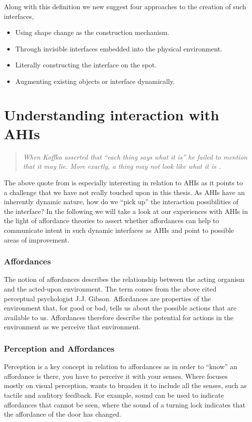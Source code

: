 Along with this definition we new suggest four approaches to the creation of such interfaces,

\begin{itemize}
	\item{Using shape change as the construction mechanism.}
	\item{Through invisible interfaces embedded into the physical environment.}
	\item{Literally constructing the interface on the spot.}
	\item{Augmenting existing objects or interface dynamically.}
\end{itemize} 

\section{Understanding interaction with AHIs}
\begin{quotation}
\emph{When Koffka asserted that ``each thing says what it is'' he failed to mention that it may lie. More exactly, a thing may not look like what it is \citep{gibson1979ecological}.}
\end{quotation}
The above quote from \citeauthor{gibson1979ecological} is especially interesting in relation to AHIs as it points to a challenge that we have not really touched upon in this thesis.
As AHIs have an inherently dynamic nature, how do we ``pick up'' the interaction possibilities of the interface? 
In the following we will take a look at our experiences with AHIs in the light of affordance theories to assert whether affordances can help to communicate intent in such dynamic interfaces as AHIs and point to possible areas of improvement.

\subsubsection{Affordances}
The notion of affordances describes the relationship between the acting organism and the acted-upon environment.
The term comes from the above cited perceptual psychologist J.J. Gibson.
Affordances are properties of the environment that, for good or bad, tells us about the possible actions that are available to us.
Affordances therefore describe the potential for actions in the environment as we perceive that environment.  

\subsubsection{Perception and Affordances}
Perception is a key concept in relation to affordances as in order to ``know'' an affordance is there, you have to perceive it with your senses. Where \citet{gibson1979ecological} focuses mostly on visual perception, \citet{gaver1991technology} wants to broaden it to include all the senses, such as tactile and auditory feedback.
For example, sound can be used to indicate affordances that cannot be seen, where the sound of a turning lock indicates that the affordance of the door has changed.

